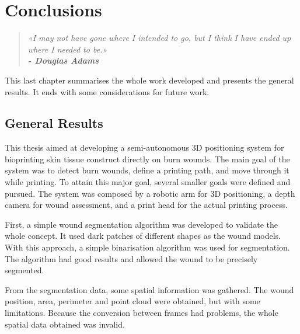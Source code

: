 \chapter{Conclusions}
\label{cha:conclusions}

\begin{quotation}
\begin{flushright}
\itshape
«I may not have gone where I intended to go, but I think I have ended up where I needed to be.»\\
\textbf{- Douglas Adams}
\end{flushright}
\end{quotation}

This last chapter summarises the whole work developed and presents the general results. It ends with some considerations for future work.


\section{General Results}
\label{sec:conclusions_general_results}

This thesis aimed at developing a semi-autonomous 3D positioning system for bioprinting skin tissue construct directly on burn wounds. The main goal of the system was to detect burn wounds, define a printing path, and move through it while printing. To attain this major goal, several smaller goals were defined and pursued. The system was composed by a robotic arm for 3D positioning, a depth camera for wound assessment, and a print head for the actual printing process.

First, a simple wound segmentation algorithm was developed to validate the whole concept. It used dark patches of different shapes as the wound models. With this approach, a simple binarisation algorithm was used for segmentation. The algorithm had good results and allowed the wound to be precisely segmented.

From the segmentation data, some spatial information was gathered. The wound position, area, perimeter and point cloud were obtained, but with some limitations. Because the conversion between frames had problems, the whole spatial data obtained was invalid.

